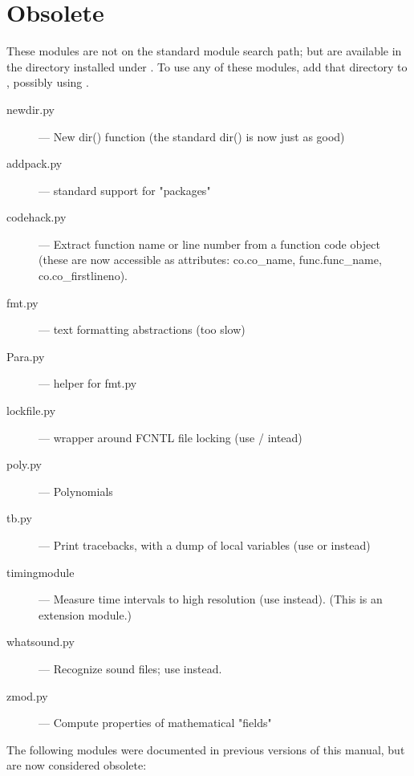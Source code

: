 \section{Obsolete}

These modules are not on the standard module search path;
but are available in the directory  installed  under
. %
To use any of these modules, add that directory to ,
possibly using .

\begin{description}
\item[newdir.py]
--- New dir() function (the standard dir() is now just as good)

\item[addpack.py]
--- standard support for "packages"

\item[codehack.py]
--- Extract function name or line number from a function
code object (these are now accessible as attributes: co.co_name,
func.func_name, co.co_firstlineno).

\item[fmt.py]
--- text formatting abstractions (too slow)

\item[Para.py]
--- helper for fmt.py

\item[lockfile.py]
--- wrapper around FCNTL file locking (use
/ intead)

\item[poly.py]
--- Polynomials

\item[tb.py]
--- Print tracebacks, with a dump of local variables (use
 or  instead)

\item[timingmodule]
--- Measure time intervals to high resolution (use
 instead).  (This is an extension module.)

\item[whatsound.py]
--- Recognize sound files; use  instead.

\item[zmod.py]
--- Compute properties of mathematical "fields"
\end{description}

The following modules were documented in previous versions of this
manual, but are now considered obsolete:


